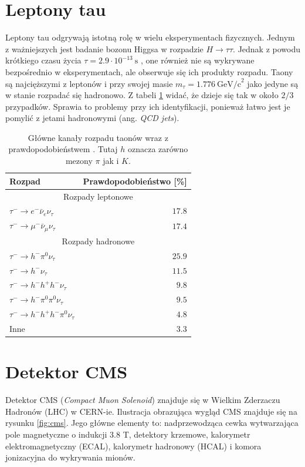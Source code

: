 \documentclass{pracalicmgr}
\begin{document}
    \section{Leptony tau}
    
    Leptony tau	odgrywają istotną rolę w wielu eksperymentach fizycznych. Jednym z ważniejszych jest badanie bozonu Higgsa w rozpadzie $H \rightarrow \tau\tau$. Jednak z powodu krótkiego czasu życia $\tau = 2.9 \cdot 10^{-13}~\mathrm{s}$ \cite{particle_physics}, one również nie są wykrywane bezpośrednio w eksperymentach, ale obserwuje się ich produkty rozpadu. Taony są najcięższymi z leptonów i przy swojej masie $m_\tau = 1.776 ~\mathrm{GeV/c}^2$ \cite{particle_physics} jako jedyne są w stanie rozpadać się hadronowo. Z tabeli \ref{tab:kanaly_rozpadu} widać, że dzieje się tak w około $2/3$ przypadków. Sprawia to problemy przy ich identyfikacji, ponieważ łatwo jest je pomylić z jetami hadronowymi (ang. \textit{QCD jets}).
    
	\begin{table}[H]
	\centering
	\caption{Główne kanały rozpadu taonów wraz z prawdopodobieństwem \cite{tauid13, particle_physics}. Tutaj $h$ oznacza zarówno mezony $\pi$ jak i $K$.}
	\label{tab:kanaly_rozpadu}
	\begin{tabular}{lr}
	\toprule
	Rozpad & Prawdopodobieństwo [\%] \\
	\midrule
	\multicolumn{2}{c}{Rozpady leptonowe} \\
	\midrule
	$\tau^- \rightarrow e^-\bar{\nu}_{e}\nu_{\tau}$ & $17.8$ \\
	$\tau^- \rightarrow \mu^-\bar{\nu}_{\mu}\nu_{\tau}$ & $17.4$ \\
	\midrule
	\multicolumn{2}{c}{Rozpady hadronowe} \\
	\midrule
	$\tau^- \rightarrow h^- \pi^0 \nu_{\tau}$ & $25.9$ \\
	$\tau^- \rightarrow h^-\nu_{\tau}$ & $11.5$ \\
	$\tau^- \rightarrow h^- h^+ h^- \nu_{\tau}$ & $9.8$ \\
	$\tau^- \rightarrow h^- \pi^0 \pi^0 \nu_{\tau}$ & $9.5$ \\
	$\tau^- \rightarrow h^- h^+ h^- \pi^0 \nu_{\tau}$ & $4.8$ \\
	Inne & $3.3$ \\	
	\bottomrule
	\end{tabular}
	\end{table}
    \newpage
    \section{Detektor CMS}
	Detektor CMS (\textit{Compact Muon Solenoid}) znajduje się w Wielkim Zderzaczu Hadronów (LHC) \cite{adolphi2008cms} w CERN-ie. Ilustracja obrazująca wygląd CMS znajduje się na rysunku \ref{fig:cms}. Jego główne elementy to: nadprzewodząca cewka wytwarzająca pole magnetyczne o indukcji 3.8 T, detektory krzemowe, kalorymetr elektromagnetyczny (ECAL), kalorymetr hadronowy (HCAL) i komora jonizacyjna do wykrywania mionów. 
	
\end{document}
